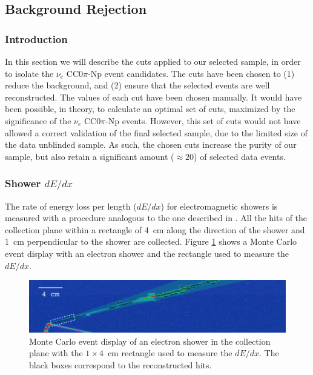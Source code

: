 \subsection{Background Rejection}\label{sec:bkg}
\subsubsection{Introduction}
In this section we will describe the cuts applied to our selected sample, in order to isolate the $\nu_{e}$ CC$0\pi$-Np event candidates. The cuts have been chosen to (1) reduce the background, and (2) ensure that the selected events are well reconstructed. The values of each cut have been chosen manually. It would have been possible, in theory, to calculate an optimal set of cuts, maximized by the significance of the $\nu_{e}$ CC0$\pi$-Np events. However, this set of cuts would not have allowed a correct validation of the final selected sample, due to the limited size of the data unblinded sample. As such, the chosen cuts increase the purity of our sample, but also retain a significant amount ($\approx 20$) of selected data events.

\subsubsection{Shower \texorpdfstring{$dE/dx$}{dE/dx}}
The rate of energy loss per length ($dE/dx$) for electromagnetic showers is measured with a procedure analogous to the one described in \cite{argoneut}. All the hits of the collection plane within a rectangle of 4~cm along the direction of the shower and 1~cm perpendicular to the shower are collected. Figure \ref{fig:evddedx} shows a Monte Carlo event display with an electron shower and the rectangle used to measure the $dE/dx$.

\begin{figure}[htbp]
\centering
  \includegraphics[width=0.9\linewidth]{figures/evddedx.png}
  \caption{Monte Carlo event display of an electron shower in the collection plane with the $1\times4$~cm rectangle used to measure the $dE/dx$. The black boxes correspond to the reconstructed hits.}
  \label{fig:evddedx}
\end{figure}

